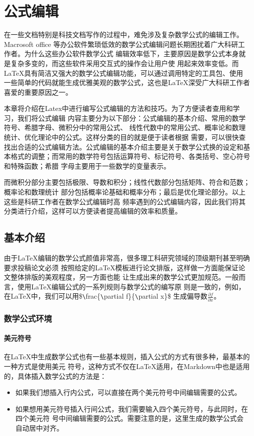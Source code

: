 \chapter{公式编辑}
在一些文档特别是科技文档写作的过程中，难免涉及复杂数学公式的编辑工作。Macrosoft office
等办公软件繁琐低效的数学公式编辑问题长期困扰着广大科研工作者。为什么这些办公软件数学公式
编辑效率低下，主要原因是数学公式本身就是复杂多变的，而这些软件采用交互式的操作会让用户使
用起来效率变低。而LaTeX具有简洁又强大的数学公式编辑功能，可以通过调用特定的工具包、使用
一些简单的代码就能生成优雅美观的数学公式，这也是LaTeX深受广大科研工作者喜爱的重要原因之一。

本章将介绍在Latex中进行编写公式编辑的方法和技巧。为了方便读者查用和学习，我们将公式编辑
内容主要分为以下部分：公式编辑的基本介绍、常用的数学符号、希腊字母、微积分中的常用公式、
线性代数中的常用公式、概率论和数理统计、优化理论中的公式。这样分类的目的就是便于读者根据
需要，可以很快查找出合适的公式编辑方法。公式编辑的基本介绍主要是关于数学公式换的设定和基
本格式的调整；而常用的数学符号包括运算符号、标记符号、各类括号、空心符号和特殊函数；希腊
字母主要用于一些数学的变量表示。

而微积分部分主要包括极限、导数和积分；线性代数部分包括矩阵、符合和范数；概率论和数理统计
部分包括概率论基础和概率分布；最后是优化理论部分。以上这些是科研工作者在数学公式编辑时高
频率遇到的公式编辑内容，因此我们将其分类进行介绍，这样可以方便读者提高编辑的效率和质量。

\section{基本介绍}
由于LaTeX编辑的数学公式颜值非常高，很多理工科研究领域的顶级期刊甚至明确要求投稿论文必须
按照给定的LaTeX模板进行论文排版，这样做一方面能保证论文整体排版的美观程度，另一方面也能
让生成出来的数学公式更加规范。一般而言，使用LaTeX编辑公式的一系列规则与数学公式的编写原
则是一致的，例如，在LaTeX中，我们可以用\$\verb|\|frac\{\verb|\|partial f\}\{\verb|\|partial x\}\$
生成偏导数$\frac{\partial f}{\partial x}$。

\subsection{数学公式环境}
\subsubsection{美元符号}
在LaTeX中生成数学公式也有一些基本规则，插入公式的方式有很多种，最基本的一种方式是使用美元
符号，这种方式不仅在LaTeX适用，在Markdown中也是适用的，具体插入数学公式的方法是：
\begin{itemize}
    \item 如果我们想插入行内公式，可以直接在两个美元符号中间编辑需要的公式。
    \item 如果想用美元符号插入行间公式，我们需要输入四个美元符号，与此同时，在四个美元符
          号中间编辑需要的公式。需要注意的是，这里生成的数学公式会自动居中对齐。
\end{itemize}

